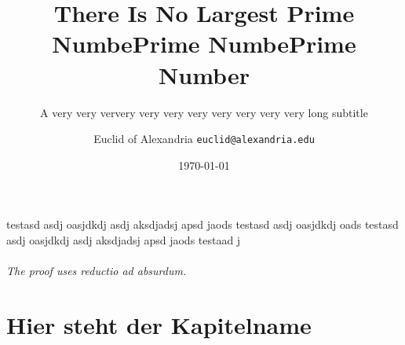 \documentclass[aspectratio=169]{beamer}
\title{There Is No Largest Prime NumbePrime NumbePrime Number}
\subtitle{A very very ververy very very very very very very very long subtitle}
\date{\today}
\author[Euclid]{Euclid of Alexandria \texttt{euclid@alexandria.edu}}
\begin{document}
	

\begin{frame}
\titlepage
\end{frame}


\begin{frame}{testasd asdj oasjdkdj asdj aksdjadsj apsd jaods testasd asdj oasjdkdj oads testasd asdj oasjdkdj asdj aksdjadsj apsd jaods testaad j}
	
	\framesubtitle{The proof uses \textit{reductio ad absurdum}.} 
	\blindtext
\end{frame}

\part{Hier steht der Kapitelname}
\end{document}
